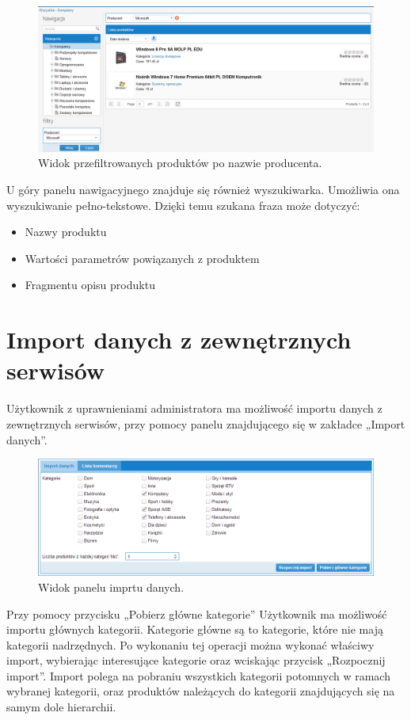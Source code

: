 \begin{figure}[h]
	\centering
	\includegraphics[width=1.00\textwidth]{images/po_nalozeniu_filtru_kategoria.png}
	\caption{Widok przefiltrowanych produktów po nazwie producenta.}
\end{figure}

\newpage

U góry panelu nawigacyjnego znajduje się również wyszukiwarka. Umożliwia ona wyszukiwanie pełno-tekstowe. Dzięki temu szukana fraza może dotyczyć:

\begin{itemize}
\item Nazwy produktu
\item Wartości parametrów powiązanych z produktem
\item Fragmentu opisu produktu
\end{itemize}

\section{Import danych z zewnętrznych serwisów}

Użytkownik z uprawnieniami administratora ma możliwość importu danych z zewnętrznych serwisów, przy pomocy panelu znajdującego się w zakładce „Import danych”.

\begin{figure}[h]
	\centering
	\includegraphics[width=1.00\textwidth]{images/Import.PNG}
	\caption{Widok panelu imprtu danych.}
\end{figure}

Przy pomocy przycisku „Pobierz główne kategorie” Użytkownik ma możliwość importu głównych kategorii. Kategorie główne są to kategorie, które nie mają kategorii nadrzędnych. Po wykonaniu tej operacji można wykonać właściwy import, wybierając interesujące kategorie oraz wciskając przycisk „Rozpocznij import”.\linebreak 
Import polega na pobraniu wszystkich kategorii potomnych w ramach wybranej kategorii, oraz produktów należących do kategorii znajdujących się na samym dole hierarchii.
